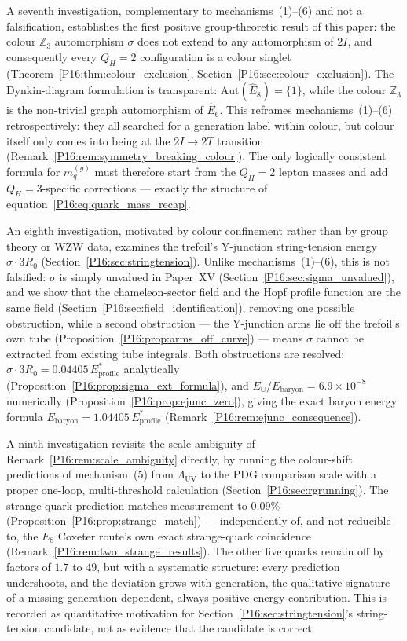 \documentclass[11pt,a4paper]{article}
\theoremstyle{definition}\newtheorem{definition}[theorem]{Definition}
\theoremstyle{remark}
\theoremstyle{definition}\newtheorem{construction}[theorem]{Construction}
\newcommand{\LUV}{\Lambda_{\mathrm{UV}}}
\newcommand{\twoI}{2I}
\newcommand{\twoT}{2T}
\newcommand{\QH}{Q_H}
\begin{document}
A seventh investigation, complementary to mechanisms~(1)--(6) and not
a falsification, establishes the first positive group-theoretic result
of this paper: the colour $\mathbb{Z}_3$ automorphism $\sigma$ does
not extend to any automorphism of $\twoI$, and consequently every
$\QH=2$ configuration is a colour singlet
(Theorem~\ref{P16:thm:colour_exclusion}, Section~\ref{P16:sec:colour_exclusion}).
The Dynkin-diagram formulation is transparent: $\mathrm{Aut}(\hat{E}_8)=\{1\}$,
while the colour $\mathbb{Z}_3$ is the non-trivial graph automorphism
of $\hat{E}_6$.  This reframes mechanisms~(1)--(6) retrospectively:
they all searched for a generation label within colour, but colour
itself only comes into being at the $\twoI\to\twoT$ transition
(Remark~\ref{P16:rem:symmetry_breaking_colour}).  The only logically
consistent formula for $m_q^{(g)}$ must therefore start from the
$\QH=2$ lepton masses and add $\QH=3$-specific corrections ---
exactly the structure of equation~\eqref{P16:eq:quark_mass_recap}.

An eighth investigation, motivated by colour confinement rather than
by group theory or WZW data, examines the trefoil's Y-junction
string-tension energy $\sigma\cdot3R_0$ (Section~\ref{P16:sec:stringtension}).
Unlike mechanisms~(1)--(6), this is not falsified: $\sigma$ is simply
unvalued in Paper~XV (Section~\ref{P16:sec:sigma_unvalued}), and we show
that the chameleon-sector field and the Hopf profile function are the
same field (Section~\ref{P16:sec:field_identification}), removing one
possible obstruction, while a second obstruction --- the Y-junction
arms lie off the trefoil's own tube
(Proposition~\ref{P16:prop:arms_off_curve}) --- means $\sigma$ cannot be
extracted from existing tube integrals. Both obstructions are resolved:
$\sigma\cdot3R_0 = 0.04405\,E_{\mathrm{profile}}^*$ analytically
(Proposition~\ref{P16:prop:sigma_ext_formula}), and
$E_\cup/E_{\mathrm{baryon}}=6.9\times10^{-8}$ numerically
(Proposition~\ref{P16:prop:ejunc_zero}), giving the exact baryon energy
formula $E_{\mathrm{baryon}}=1.04405\,E_{\mathrm{profile}}^*$
(Remark~\ref{P16:rem:ejunc_consequence}).

A ninth investigation revisits the scale ambiguity of
Remark~\ref{P16:rem:scale_ambiguity} directly, by running the colour-shift
predictions of mechanism~(5) from $\LUV$ to the PDG comparison scale
with a proper one-loop, multi-threshold calculation
(Section~\ref{P16:sec:rgrunning}). The strange-quark prediction matches
measurement to $0.09\%$ (Proposition~\ref{P16:prop:strange_match}) ---
independently of, and not reducible to, the $E_8$ Coxeter route's own
exact strange-quark coincidence
(Remark~\ref{P16:rem:two_strange_results}). The other five quarks remain
off by factors of $1.7$ to $49$, but with a systematic structure: every
prediction undershoots, and the deviation grows with generation,
the qualitative signature of a missing generation-dependent,
always-positive energy contribution. This is recorded as quantitative
motivation for Section~\ref{P16:sec:stringtension}'s string-tension
candidate, not as evidence that the candidate is correct.
\end{document}
